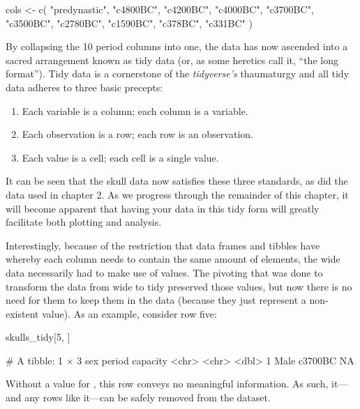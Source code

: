 \begin{inR}
cols <- c(
  "predynastic", "c4800BC", "c4200BC", "c4000BC", "c3700BC",
  "c3500BC", "c2780BC", "c1590BC", "c378BC", "c331BC"
)
\end{inR}
\vspace{1em}

By collapsing the 10 period columns into one, the data has now ascended into a sacred arrangement known as \gls{tidy data} (or, as some heretics call it, ``the long format'').  Tidy data is a cornerstone of the \textit{tidyverse's} thaumaturgy and all tidy data adheres to three basic precepts:

\begin{minipage}{\textwidth}

\begin{enumerate}[label=\Roman*.]
\IMFellEnglish
    \item Each variable is a column; each column is a variable.
    \item Each observation is a row; each row is an observation.
    \item Each value is a cell; each cell is a single value.
\end{enumerate}
\end{minipage}

\noindent
It can be seen that the skull data now satisfies these three standards, as did the  data used in chapter 2. As we progress through the remainder of this chapter, it will become apparent that having your data in this tidy form will greatly facilitate both plotting and analysis. 

Interestingly, because of the restriction that data frames and tibbles have whereby each column needs to contain the same amount of elements, the wide data necessarily had to make use of  values. The pivoting that was done to transform the data from wide to tidy preserved those  values, but now there is no need for them to keep them in the data (because they just represent a non-existent value). As an example, consider row five:

\begin{inR}
skulls_tidy[5, ]
\end{inR}
\begin{outR}
# A tibble: 1 × 3
  sex   period  capacity
  <chr> <chr>      <dbl>
1 Male  c3700BC       NA
\end{outR}

\noindent
Without a value for , this row conveys no meaningful information. As such, it—and any rows like it—can be safely removed from the dataset.

